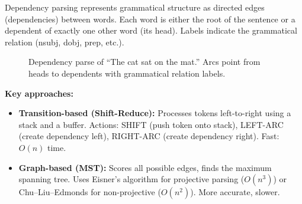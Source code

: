 Dependency parsing represents grammatical structure as directed edges (dependencies)
between words. Each word is either the root of the sentence or a dependent of exactly
one other word (its head). Labels indicate the grammatical relation (nsubj, dobj, prep,
etc.).

\begin{figure}[H]
\centering
{}
\caption{Dependency parse of ``The cat sat on the mat.'' Arcs point from heads to
dependents with grammatical relation labels.}
\label{fig:dependency_parse}
\end{figure}

\textbf{Key approaches:}
\begin{itemize}
    \item \textbf{Transition-based (Shift-Reduce):} Processes tokens left-to-right using a
    stack and a buffer. Actions: SHIFT (push token onto stack), LEFT-ARC (create
    dependency left), RIGHT-ARC (create dependency right). Fast: $O(n)$ time.
    \item \textbf{Graph-based (MST):} Scores all possible edges, finds the maximum
    spanning tree. Uses Eisner's algorithm for projective parsing ($O(n^3)$) or
    Chu--Liu--Edmonds for non-projective ($O(n^2)$). More accurate, slower.
\end{itemize}

